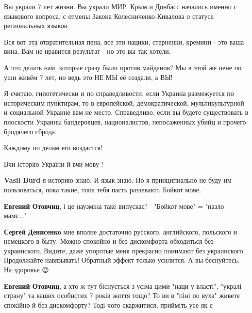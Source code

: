 \begin{itemize}
Вы украли 7 лет жизни. Вы украли МИР. Крым и Донбасс начались именно с
языкового вопроса, с отмены Закона Колесниченко-Кивалова о статусе региональных
языков.

Вся вот эта отвратительная пена, все эти нацики, стерненки, кремини - это ваша
вина. Вам не нравится результат - но это вы так хотели.

А что делать нам, которые сразу были против майданов? Мы в этой же пене по уши
живём 7 лет, но ведь это НЕ МЫ её создали, а ВЫ!

Я считаю, гипотетически и по справедливости, если Украина размежуется по
историческим пунктирам, то в европейской, демократической, мультикультурной и
социальной Украине вам не место. Справедливо, если вы будете существовать в
плоскости Украины бандеровцев, националистов, непосаженных убийц и прочего
бродячего сброда.

Каждому по делам его воздастся!

\begin{itemize}

Вчи історію України й вчи мову !


\textbf{Vasil Burd} я историю знаю. И язык знаю. Но я принципиально не буду им пользоваться, пока такие, типа тебя пасть раззевают.
Бойкот мове.


\textbf{Евгений Отовчиц}, і це наузміна таке випускає? 🤣
"Бойкот мове" = "назло мамє..."


\textbf{Сергей Денисенко} мне вполне достаточно русского, английского, польского и немецкого в быту. Можно спокойно и без дискомфорта обходиться без украинского. Видите, даже упоротые меня прекрасно понимают без украинского. Продолжайте навязывать! Обратный эффект только усилится.
А вы беснуйтесь. На здоровье 😉


\textbf{Евгений Отовчиц}, а хто ж тут біснується з усіма цими "наци у власті",
"укралі страну" та ваших особистих 7 років життя тощо? То ви в "піні по вуха"
живете спокійно й без дискомфорту? Тоді чого скаржитися, прийміть усе як є \Smiley[1.0][yellow]


\end{itemize}
\end{itemize}
